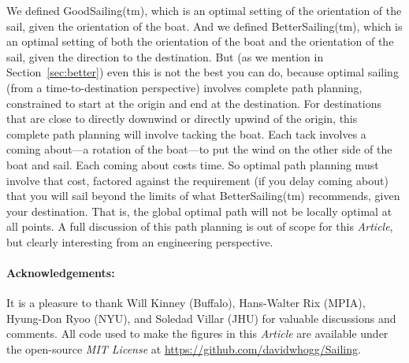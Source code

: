 \documentclass[letterpaper]{article}
\newcommand{\documentname}{\textsl{Article}}
\newcommand{\secref}[1]{Section~\ref{#1}}
\begin{document}
We defined GoodSailing(tm), which is an optimal setting of the orientation of the sail, given the orientation of the boat.
And we defined BetterSailing(tm), which is an optimal setting of both the orientation of the boat and the orientation of the sail, given the direction to the destination.
But (as we mention in \secref{sec:better}) even this is not the best you can do, because optimal sailing (from a time-to-destination perspective) involves complete path planning, constrained to start at the origin and end at the destination.
For destinations that are close to directly downwind or directly upwind of the origin, this complete path planning will involve tacking the boat.
Each tack involves a coming about---a rotation of the boat---to put the wind on the other side of the boat and sail.
Each coming about costs time.
So optimal path planning must involve that cost, factored against the requirement (if you delay coming about) that you will sail beyond the limits of what BetterSailing(tm) recommends, given your destination.
That is, the global optimal path will not be locally optimal at all points.
A full discussion of this path planning is out of scope for this \documentname, but clearly interesting from an engineering perspective.

\paragraph{Acknowledgements:}
It is a pleasure to thank Will Kinney (Buffalo), Hans-Walter Rix (MPIA), Hyung-Don Ryoo (NYU), and Soledad Villar (JHU) for valuable discussions and comments.
All code used to make the figures in this \documentname{} are available under the open-source \textsl{MIT License} at \url{https://github.com/davidwhogg/Sailing}.



\end{document}
